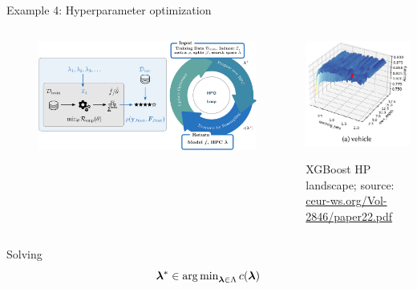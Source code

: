 \documentclass[11pt,compress,t,notes=noshow, xcolor=table]{beamer}
\begin{document}
\begin{vbframe}{Example 4: Hyperparameter optimization}
\begin{columns}
\begin{column}{0.6\textwidth}
\begin{figure}[h]
	\centering
	\includegraphics{figure_man/hpo_loop_1.png}
\end{figure}
\end{column}
\begin{column}{0.4\textwidth}
		\begin{center}
\includegraphics{figure_man/landscapes2.jpg}
\begin{tiny}{XGBoost HP landscape; source: \url{ceur-ws.org/Vol-2846/paper22.pdf}}\end{tiny}
\end{center}
\end{column}
\end{columns}

\framebreak 
		
Solving 
\vspace*{-0.2cm}
$$
\bm{\lambda}^\ast \in \operatorname{arg\,min}_{\bm{\lambda} \in \Lambda} c(\bm{\lambda})
$$


\end{vbframe}
\end{document}
